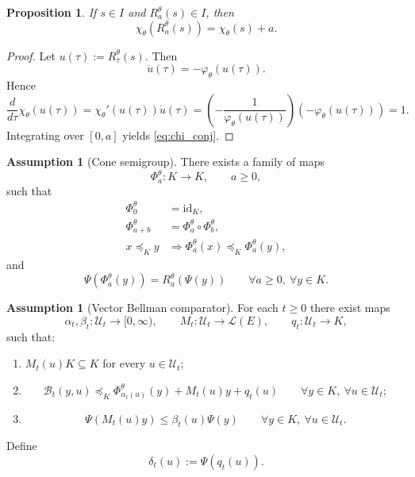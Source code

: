 \documentclass{article}
\newtheorem{proposition}[theorem]{Proposition}
\theoremstyle{definition}
\newtheorem{assumption}[theorem]{Assumption}
\begin{document}
\begin{proposition}
\label{prop:chi}
If $s\in I$ and $R_a^\theta(s)\in I$, then
\begin{equation}
\chi_\theta(R_a^\theta(s))=\chi_\theta(s)+a.
\label{eq:chi_conj}
\end{equation}
\end{proposition}

\begin{proof}
Let $u(\tau):=R_\tau^\theta(s)$. Then
\[
\dot u(\tau)=-\varphi_\theta(u(\tau)).
\]
Hence
\[
\frac{d}{d\tau}\chi_\theta(u(\tau))
=
\chi_\theta'(u(\tau))\dot u(\tau)
=
\left(-\frac{1}{\varphi_\theta(u(\tau))}\right)\!\left(-\varphi_\theta(u(\tau))\right)
=
1.
\]
Integrating over $[0,a]$ yields \eqref{eq:chi_conj}.
\end{proof}

\begin{assumption}[Cone semigroup]
\label{ass:cone_semigroup}
There exists a family of maps
\[
\Phi_a^\theta:K\to K,
\qquad a\ge 0,
\]
such that
\begin{align*}
\Phi_0^\theta&=\mathrm{id}_K,
\\
\Phi_{a+b}^\theta&=\Phi_a^\theta\circ\Phi_b^\theta,
\\
x\preceq_K y &\Longrightarrow \Phi_a^\theta(x)\preceq_K \Phi_a^\theta(y),
\end{align*}
and
\begin{equation}
\Psi(\Phi_a^\theta(y))
=
R_a^\theta(\Psi(y))
\qquad
\forall a\ge 0,\ \forall y\in K.
\label{eq:cone_shadow}
\end{equation}
\end{assumption}

\begin{assumption}[Vector Bellman comparator]
\label{ass:vector_comp}
For each $t\ge 0$ there exist maps
\[
\alpha_t,\beta_t:\mathcal U_t\to[0,\infty),
\qquad
M_t:\mathcal U_t\to \mathcal L(E),
\qquad
q_t:\mathcal U_t\to K,
\]
such that:
\begin{enumerate}
\item $M_t(u)K\subseteq K$ for every $u\in\mathcal U_t$;
\item
\begin{equation}
\mathcal B_t(y,u)
\preceq_K
\Phi_{\alpha_t(u)}^\theta(y)+M_t(u)y+q_t(u)
\qquad
\forall y\in K,\ \forall u\in\mathcal U_t;
\label{eq:vector_comp}
\end{equation}
\item
\begin{equation}
\Psi(M_t(u)y)\le \beta_t(u)\Psi(y)
\qquad
\forall y\in K,\ \forall u\in\mathcal U_t.
\label{eq:M_bound}
\end{equation}
\end{enumerate}
Define
\begin{equation}
\delta_t(u):=\Psi(q_t(u)).
\label{eq:delta}
\end{equation}
\end{assumption}
\end{document}
